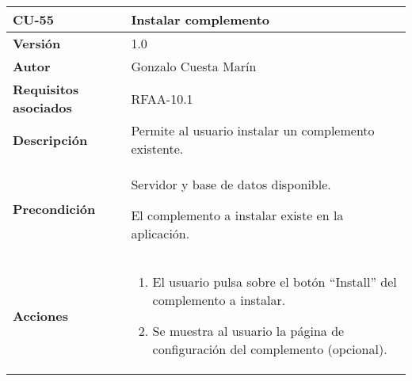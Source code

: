 \begin{longtable}[]{@{}ll@{}}
\toprule
\begin{minipage}[b]{0.24\columnwidth}\raggedright
\textbf{CU-55}\strut
\end{minipage} & \begin{minipage}[b]{0.71\columnwidth}\raggedright
\textbf{Instalar complemento}\strut
\end{minipage}\tabularnewline
\midrule
\endhead
\begin{minipage}[t]{0.24\columnwidth}\raggedright
\textbf{Versión}\strut
\end{minipage} & \begin{minipage}[t]{0.71\columnwidth}\raggedright
1.0\strut
\end{minipage}\tabularnewline
\begin{minipage}[t]{0.24\columnwidth}\raggedright
\textbf{Autor}\strut
\end{minipage} & \begin{minipage}[t]{0.71\columnwidth}\raggedright
Gonzalo Cuesta Marín\strut
\end{minipage}\tabularnewline
\begin{minipage}[t]{0.24\columnwidth}\raggedright
\textbf{Requisitos asociados}\strut
\end{minipage} & \begin{minipage}[t]{0.71\columnwidth}\raggedright
RFAA-10.1\strut
\end{minipage}\tabularnewline
\begin{minipage}[t]{0.24\columnwidth}\raggedright
\textbf{Descripción}\strut
\end{minipage} & \begin{minipage}[t]{0.71\columnwidth}\raggedright
Permite al usuario instalar un complemento existente.\strut
\end{minipage}\tabularnewline
\begin{minipage}[t]{0.24\columnwidth}\raggedright
\textbf{Precondición}\strut
\end{minipage} & \begin{minipage}[t]{0.71\columnwidth}\raggedright
Servidor y base de datos disponible.

El complemento a instalar existe en la aplicación.\strut
\end{minipage}\tabularnewline
\begin{minipage}[t]{0.24\columnwidth}\raggedright
\textbf{Acciones}\strut
\end{minipage} & \begin{minipage}[t]{0.71\columnwidth}\raggedright
\begin{enumerate}
\def\labelenumi{\arabic{enumi}.}
\tightlist
\item
  El usuario pulsa sobre el botón ``Install'' del complemento a instalar.
\item
  Se muestra al usuario la página de configuración del complemento
  (opcional).
\end{enumerate}


\end{minipage}
\end{longtable}
